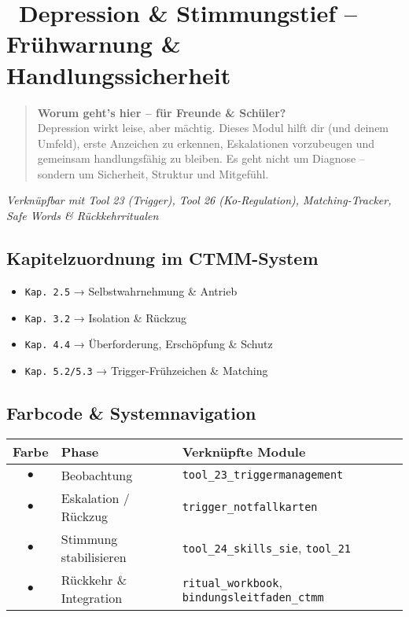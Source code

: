 \section*{\textcolor{ctmmBlue}{\faCloudRain~Depression \& Stimmungstief -- Frühwarnung \& Handlungssicherheit}}

\begin{quote}
\textbf{\textcolor{ctmmBlue}{Worum geht's hier -- für Freunde \& Schüler?}}\\
Depression wirkt leise, aber mächtig. Dieses Modul hilft dir (und deinem Umfeld), erste Anzeichen zu erkennen, Eskalationen vorzubeugen und gemeinsam handlungsfähig zu bleiben. Es geht nicht um Diagnose -- sondern um Sicherheit, Struktur und Mitgefühl.
\end{quote}

\textit{Verknüpfbar mit Tool 23 (Trigger), Tool 26 (Ko-Regulation), Matching-Tracker, Safe Words \& Rückkehrritualen}

\subsection*{\textcolor{ctmmBlue}{Kapitelzuordnung im CTMM-System}}

\begin{itemize}
  \item \texttt{Kap. 2.5} → Selbstwahrnehmung \& Antrieb
  \item \texttt{Kap. 3.2} → Isolation \& Rückzug
  \item \texttt{Kap. 4.4} → Überforderung, Erschöpfung \& Schutz
  \item \texttt{Kap. 5.2/5.3} → Trigger-Frühzeichen \& Matching
\end{itemize}

\subsection*{\textcolor{ctmmBlue}{Farbcode \& Systemnavigation}}

\begin{tabular}{|c|l|l|}
\hline
\textbf{Farbe} & \textbf{Phase} & \textbf{Verknüpfte Module} \\
\hline
\textcolor{ctmmBlue}{$\bullet$} & Beobachtung & \texttt{tool\_23\_triggermanagement} \\
\textcolor{ctmmRed}{$\bullet$} & Eskalation / Rückzug & \texttt{trigger\_notfallkarten} \\
\textcolor{ctmmOrange}{$\bullet$} & Stimmung stabilisieren & \texttt{tool\_24\_skills\_sie}, \texttt{tool\_21} \\
\textcolor{ctmmPurple}{$\bullet$} & Rückkehr \& Integration & \texttt{ritual\_workbook}, \texttt{bindungsleitfaden\_ctmm} \\
\hline
\end{tabular}

